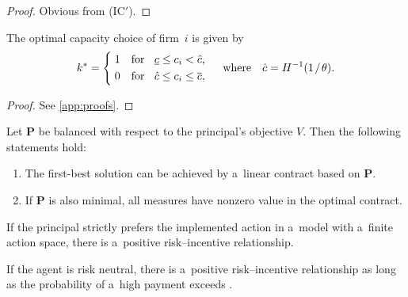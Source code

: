 \begin{proof}%
	Obvious from (IC$'$).
\end{proof}

\begin{lemma}
	\label{lemma:budde-goex-1}
	The optimal capacity choice of firm~$i$ is given by
	\begin{equation*}
		k^* =
		\begin{cases*}
			\strut \; 1 & for\;\; $\underline{c} \leq c_i < \hat{c}$, \\
			\strut \; 0 & for\;\; $\hat{c} \leq c_i \leq \overline{c}$,
		\end{cases*}
		\quad \text{where} \quad \hat{c} = H^{-1}(1 \divslash \theta).
	\end{equation*}
\end{lemma}

\begin{proof}
	See \autoref{app:proofs}.
\end{proof}

\begin{proposition}
	\label{proposition:budde-1}
	Let $\bm{P}$ be balanced with respect to the principal's objective $V$. Then the following statements hold:
	\begin{enumerate}[label = (\roman*), align = right, leftmargin = \baselinedist, labelsep = 0.3\baselinedist]
		\item The first-best solution can be achieved by a~linear contract based on $\bm{P}$.
		\item If $\bm{P}$ is also minimal, all measures have nonzero value in the optimal contract.
	\end{enumerate}
\end{proposition}

\begin{proposition}
	\label{proposition:budde-kraekel-3}
	If the principal strictly prefers the implemented action in a~model with a~finite action space, there is a~positive risk--incentive relationship.
\end{proposition}

\begin{proposition}
	\label{proposition:budde-kraekel-4}
	If the agent is risk neutral, there is a~positive risk--incentive relationship as long as the probability of a~high payment exceeds \textonehalf.
\end{proposition}

